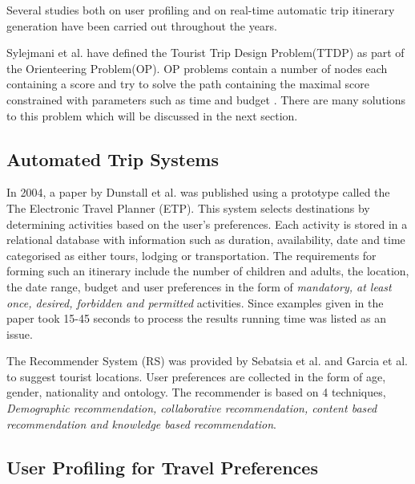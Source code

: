 Several studies both on user profiling and on real-time automatic trip
itinerary generation have been carried out throughout the years. 

Sylejmani et al.\cite{Sylejmani2017} have defined the Tourist Trip
Design Problem(TTDP) as part of the Orienteering Problem(OP). OP
problems contain a number of nodes each containing a score and try to
solve the path containing the maximal score constrained with
parameters such as time and budget \cite{Gunawan2016}. There are many
solutions to this problem which will be discussed in the next section.

\subsection{Automated Trip Systems}


In 2004, a paper by Dunstall et al. \cite{DUNSTALL2008a} was published
using a prototype called the The Electronic Travel Planner (ETP). This
system selects destinations by determining activities based on the
user’s preferences. Each activity is stored in a relational database
with information such as duration, availability, date and time
categorised as either tours, lodging or transportation. The
requirements for forming such an itinerary include the number of
children and adults, the location, the date range, budget and user
preferences in the form of \emph{mandatory, at least once, desired,
forbidden and permitted} activities. Since examples given in the paper took 15-45 seconds to process
the results running time was listed as an issue.

The Recommender System (RS) was provided by Sebatsia et al.
\cite{Sebastia2009a} and Garcia et al. \cite{Garcia2011} to suggest tourist locations.
User preferences are collected in the form of age, gender, nationality
and ontology. The recommender is based on 4 techniques, \emph{Demographic
recommendation, collaborative recommendation, content based
recommendation and knowledge based recommendation}. 




\subsection{User Profiling for Travel Preferences}
 